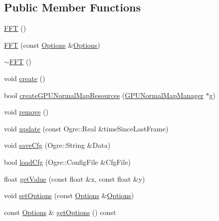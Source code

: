 \subsection*{Public Member Functions}
\begin{CompactItemize}
\item 
\hyperlink{class_hydrax_1_1_noise_1_1_f_f_t_5e4f2e1075138aa5255e0f2c90f0e004}{FFT} ()
\item 
\hyperlink{class_hydrax_1_1_noise_1_1_f_f_t_39e0f2bd11f4fcd7afab5a0977446c3e}{FFT} (const \hyperlink{struct_hydrax_1_1_noise_1_1_f_f_t_1_1_options}{Options} \&\hyperlink{struct_hydrax_1_1_noise_1_1_f_f_t_1_1_options}{Options})
\item 
\hyperlink{class_hydrax_1_1_noise_1_1_f_f_t_fd96b8a520f12c10d7cffe16a776034e}{$\sim$FFT} ()
\item 
void \hyperlink{class_hydrax_1_1_noise_1_1_f_f_t_c382e8624b864a32267687592b769bd3}{create} ()
\item 
bool \hyperlink{class_hydrax_1_1_noise_1_1_f_f_t_a8e2b9d2b8307c07be2d2cd9cf115560}{createGPUNormalMapResources} (\hyperlink{class_hydrax_1_1_g_p_u_normal_map_manager}{GPUNormalMapManager} $\ast$g)
\item 
void \hyperlink{class_hydrax_1_1_noise_1_1_f_f_t_9567d90d8fae8dbd74d05d1e3b8281e4}{remove} ()
\item 
void \hyperlink{class_hydrax_1_1_noise_1_1_f_f_t_edb7b8614828cda29b62aa6c1509e22a}{update} (const Ogre::Real \&timeSinceLastFrame)
\item 
void \hyperlink{class_hydrax_1_1_noise_1_1_f_f_t_6e045d4c71f1005305445dbae8701736}{saveCfg} (Ogre::String \&Data)
\item 
bool \hyperlink{class_hydrax_1_1_noise_1_1_f_f_t_64245b9e56eeb8627ac3f5260dc203dd}{loadCfg} (Ogre::ConfigFile \&CfgFile)
\item 
float \hyperlink{class_hydrax_1_1_noise_1_1_f_f_t_e7da5bf6c6ebfc9061ed433af6350ea7}{getValue} (const float \&x, const float \&y)
\item 
void \hyperlink{class_hydrax_1_1_noise_1_1_f_f_t_1d7ec06eb11cda608cc8f73256c35be5}{setOptions} (const \hyperlink{struct_hydrax_1_1_noise_1_1_f_f_t_1_1_options}{Options} \&\hyperlink{struct_hydrax_1_1_noise_1_1_f_f_t_1_1_options}{Options})
\item 
const \hyperlink{struct_hydrax_1_1_noise_1_1_f_f_t_1_1_options}{Options} \& \hyperlink{class_hydrax_1_1_noise_1_1_f_f_t_5207977ba1623fef59570e8f2f1c738c}{getOptions} () const 
\end{CompactItemize}


